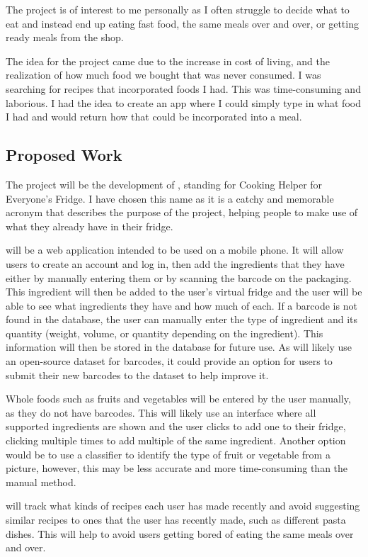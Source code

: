 \documentclass[../CHEFCookingHelperForEveryonesFridge.tex]{subfiles}
\begin{document}
The project is of interest to me personally as I often struggle to decide what to eat and instead end up eating fast food,
the same meals over and over, or getting ready meals from the shop.

The idea for the project came due to the increase in cost of living, and the realization of how much food we bought that was
never consumed. I was searching for recipes that incorporated foods I had. This was time-consuming and laborious.
I had the idea to create an app where I could simply type in what food I had and would return how that could be incorporated
into a meal.

\subsection{Proposed Work}
The project will be the development of \chef{}, standing for Cooking Helper for Everyone's Fridge. I have chosen this name
as it is a catchy and memorable acronym that describes the purpose of the project, helping people to make use of
what they already have in their fridge.

\chef{} will be a web application intended to be used on a mobile phone. It will allow users to create an account and log in,
then add the ingredients that they have either by manually entering them or by scanning the barcode on the packaging.
This ingredient will then be added to the user's virtual fridge and the user will be able to see what ingredients they have and how much of each.
If a barcode is not found in the database, the user can manually enter the type of ingredient and its quantity (weight, volume, or quantity depending on the ingredient).
This information will then be stored in the database for future use. As \chef{} will likely use an open-source dataset for barcodes, it could provide an option
for users to submit their new barcodes to the dataset to help improve it.

Whole foods such as fruits and vegetables will be entered by the user manually, as they do not have barcodes. This will likely use an interface where
all supported ingredients are shown and the user clicks to add one to their fridge, clicking multiple times to add multiple of the same ingredient.
Another option would be to use a classifier to identify the type of fruit or vegetable from a picture, however, this may be less accurate and more
time-consuming than the manual method.

\chef{} will track what kinds of recipes each user has made recently and avoid suggesting similar recipes
to ones that the user has recently made, such as different pasta dishes. This will help to avoid users
getting bored of eating the same meals over and over.
\end{document}
